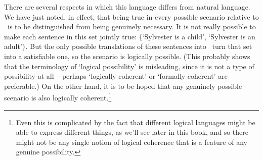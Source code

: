 There are several respects in which this language differs from natural language. We have just noted, in effect, that being true in every possible scenario relative to \lone\ is to be distinguished from being genuinely necessary. It is not really possible to make each sentence in this set jointly true: $\{$‘Sylvester is a child’, ‘Sylvester is an adult’$\}$. But the only possible translations of these sentences into \lone\ turn that set into a satisfiable one, so the scenario is logically possible. (This probably shows that the terminology of ‘logical possibility’ is misleading, since it is not a type of possibility at all – perhaps ‘logically coherent’ or `formally coherent' are preferable.)  On the other hand, it is to be hoped that any genuinely possible scenario is also logically coherent.\footnote{Even this is complicated by the fact that different logical languages might be able to express different things, as we'll see later in this book, and so there might not be any single notion of logical coherence that is a feature of any genuine possibility.}

